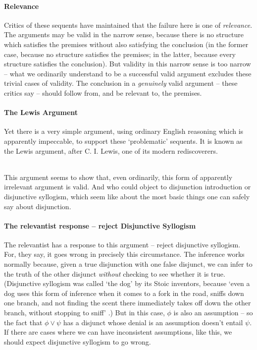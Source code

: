 \paragraph{Relevance} Critics of these sequents have maintained that the failure here is one of \emph{relevance}. The arguments may be valid in the narrow sense, because there is no structure which satisfies the premises without also satisfying the conclusion (in the former case, because no structure satisfies the premises; in the latter, because every structure satisfies the conclusion). But validity in this narrow sense is too narrow – what we ordinarily understand to be a successful valid argument excludes these trivial cases of validity. The conclusion in a \emph{genuinely} valid argument – these critics say – should follow from, and be relevant to, the premises.

\paragraph{The Lewis Argument} Yet there is a very simple argument, using ordinary English reasoning which is apparently impeccable, to support these `problematic' sequents. It is known as the Lewis argument, after C. I. Lewis, one of its modern rediscoverers. \\ ~

This argument seems to show that, even ordinarily, this form of apparently irrelevant argument is valid. And who could object to disjunction introduction or disjunctive syllogism, which seem like about the most basic things one can safely say about disjunction.

\paragraph{The relevantist response – reject Disjunctive Syllogism} The relevantist has a response to this argument – reject disjunctive syllogism. For, they say, it goes wrong in precisely this circumstance. The inference works normally because, given a true disjunction with one false disjunct, we can infer to the truth of the other disjunct \emph{without} checking to see whether it is true. (Disjunctive syllogism was called `the dog' by its Stoic inventors, because `even a dog uses this form of inference when it comes to a fork in the road, sniffs down one branch, and not finding the scent there immediately takes off down the other branch, without stopping to sniff' \citep[99--100]{burphilo}.) But in this case, $\phi$  is also an assumption – so the fact that $\phi \vee \psi$ has a disjunct whose denial is an assumption doesn't entail $\psi$. If there are cases where we can have inconsistent assumptions, like this, we should expect disjunctive syllogism to go wrong.

